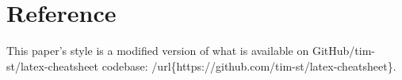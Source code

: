 \section{Reference}
This paper's style is a modified version of what is available on GitHub/tim-st/latex-cheatsheet codebase: /url\{https://github.com/tim-st/latex-cheatsheet\}.
